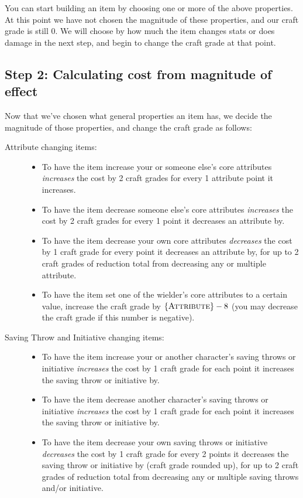 You can start building an item by choosing one or more of the above properties. At this point we have not chosen the magnitude of these properties, and our craft grade is still 0. We will choose by how much the item changes stats or does damage in the next step, and begin to change the craft grade at that point.

\subsection{Step 2: Calculating cost from magnitude of effect}
Now that we've chosen what general properties an item has, we decide the magnitude of those properties, and change the craft grade as follows:
\begin{description}
	\item[Attribute changing items:] \hfill
	\begin{itemize}
		\item To have the item increase your or someone else's core attributes \emph{increases} the cost by 2 craft grades for every 1 attribute point it increases.
		\item To have the item decrease someone else's core attributes \emph{increases} the cost by 2 craft grades for every 1 point it decreases an attribute by.
		\item To have the item decrease your own core attributes \emph{decreases} the cost by 1 craft grade for every point it decreases an attribute by, for up to 2 craft grades of reduction total from decreasing any or multiple attribute.
		\item To have the item set one of the wielder's core attributes to a certain value, increase the craft grade by $\{ \textsc{Attribute} \}-8$ (you may decrease the craft grade if this number is negative).
	\end{itemize}
	\item [Saving Throw and Initiative changing items:] \hfill
	\begin{itemize}
		\item To have the item increase your or another character's saving throws or initiative \emph{increases} the cost by 1 craft grade for each point it increases the saving throw or initiative by.
		\item To have the item decrease another character's saving throws or initiative \emph{increases} the cost by 1 craft grade for each point it increases the saving throw or initiative by.
		\item To have the item decrease your own saving throws or initiative \emph{decreases} the cost by 1 craft grade for every 2 points it decreases the saving throw or initiative by (craft grade rounded up), for up to 2 craft grades of reduction total from decreasing any or multiple saving throws and/or initiative.

\end{itemize}
\end{description}
